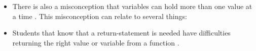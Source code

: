 \documentclass[onecolumn]{article}
\begin{document}
\begin{itemize}
    \item There is also a misconception that variables can hold more than 
one value at a time \parencite{Doukakis2007}. This misconception can 
relate to several things:

    \item Students that know that a return-statement is needed have 
difficulties returning the right value or variable from a function 
\parencite{KumarVeerasamy2016}. 

\end{itemize}
\end{document}
